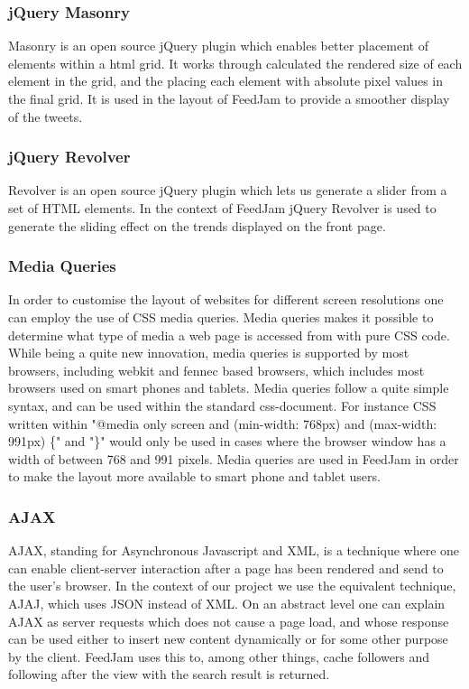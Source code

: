 \subsubsection{jQuery Masonry}
Masonry is an open source jQuery plugin which enables better placement of elements within a html grid. It works through calculated the rendered size of each element in the grid, and the placing each element with absolute pixel values in the final grid. It is used in the layout of FeedJam to provide a smoother display of the tweets.

\subsubsection{jQuery Revolver}
Revolver is an open source jQuery plugin which lets us generate a slider from a set of HTML elements. In the context of FeedJam jQuery Revolver is used to generate the sliding effect on the trends displayed on the front page.

\subsubsection{Media Queries} %
In order to customise the layout of websites for different screen resolutions one can employ the use of CSS media queries. Media queries makes it possible to determine what type of media a web page is accessed from with pure CSS code. While being a quite new innovation, media queries is supported by most browsers, including webkit and fennec based browsers, which includes most browsers used on smart phones and tablets. Media queries follow a quite simple syntax, and can be used within the standard css-document. For instance CSS written within "@media only screen and (min-width: 768px) and (max-width: 991px) \{" and "\}" would only be used in cases where the browser window has a width of between 768 and 991 pixels. Media queries are used in FeedJam in order to make the layout more available to smart phone and tablet users.

\subsubsection{AJAX}%
AJAX, standing for Asynchronous Javascript and XML, is a technique where one can enable client-server interaction after a page has been rendered and send to the user's browser. In the context of our project we use the equivalent technique, AJAJ, which uses JSON instead of XML. On an abstract level one can explain AJAX as server requests which does not cause a page load, and whose response can be used either to insert new content dynamically or for some other purpose by the client. FeedJam uses this to, among other things, cache followers and following after the view with the search result is returned. 

